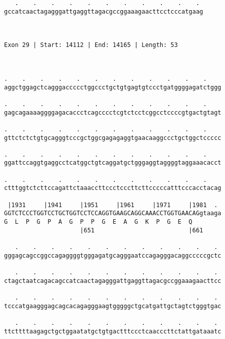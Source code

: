 \documentclass{article}
\begin{document}
\begin{Verbatim}
   .    .    .    .    .    .    .    .    .    .    . 
gccatcaactagagggattgaggttagacgccggaaagaacttcctcccatgaag
                                                       
                                                       
 
Exon 29 | Start: 14112 | End: 14165 | Length: 53



.    .    .    .    .    .    .    .    .    .    .    .    
aggctggagctcagggaccccctggccctgctgtgagtgtccctgatggggagatctggg
                                                            
.    .    .    .    .    .    .    .    .    .    .    .    
gagcagaaaaggggagacaccctcagcccctcgtctcctcggcctccccgtgactgtagt
                                                            
.    .    .    .    .    .    .    .    .    .    .    .    
gttctctctgtgcagggtcccgctggcgagagaggtgaacaaggccctgctggctccccc
                                                            
.    .    .    .    .    .    .    .    .    .    .    .    
ggattccaggtgaggcctcatggctgtcaggatgctgggaggtaggggtaggaaacacct
                                                            
.    .    .    .    .    .    .    .    .    .    .    .    
ctttggtctcttccagattctaaaccttccctcccttcttcccccatttcccacctacag
                                                            
 |1931     |1941     |1951     |1961     |1971     |1981  . 
GGTCTCCCTGGTCCTGCTGGTCCTCCAGGTGAAGCAGGCAAACCTGGTGAACAGgtaaga
G  L  P  G  P  A  G  P  P  G  E  A  G  K  P  G  E  Q        
                     |651                          |661     
  
   .    .    .    .    .    .    .    .    .    .    .    . 
gggagcagccggccagaggggtgggagatgcagggaatccagagggacaggcccccgctc
                                                            
   .    .    .    .    .    .    .    .    .    .    .    . 
ctagctaatcagacagccatcaactagagggattgaggttagacgccggaaagaacttcc
                                                            
   .    .    .    .    .    .    .    .    .    .    .    . 
tcccatgaagggagcagcacagagggaagtgggggctgcatgattgctagtctgggtgac
                                                            
   .    .    .    .    .    .    .    .    .    .    .    . 
ttcttttaagagctgctggaatatgctgtgactttccctcaacccttctattgataaatc
                                                            

\end{Verbatim}
\end{document}
